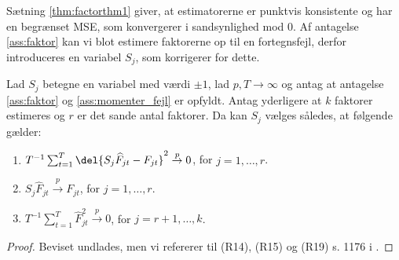 Sætning \ref{thm:factorthm1} giver, at estimatorerne er punktvis konsistente og har en begrænset MSE, som konvergerer i sandsynlighed mod 0.
Af antagelse \ref{ass:faktor} kan vi blot estimere faktorerne op til en fortegnsfejl, derfor introduceres en variabel \(S_j\), som korrigerer for dette.
%
\begin{thm} \label{thm:factorthm1}
Lad \(S_j\) betegne en variabel med værdi \(\pm 1\), lad \(p, T \rightarrow \infty\) og antag at antagelse \ref{ass:faktor} og \ref{ass:momenter_fejl} er opfyldt.
Antag yderligere at \(k\) faktorer estimeres og \(r\) er det sande antal faktorer.
Da kan \(S_j\) vælges således, at følgende gælder:
\begin{enumerate}[label=\alph*)]
\item \(T^{-1} \sum_{t=1}^T \del{S_j \widehat{F}_{jt} - F_{jt}}^2 \overset{p}{\rightarrow} 0\), for \(j=1, \ldots, r\).
\item \(S_j \widehat{F}_{jt} \overset{p}{\rightarrow} F_{jt}\), for \(j=1, \ldots, r\).
\item \(T^{-1} \sum_{t=1}^T \widehat{F}_{jt}^2 \overset{p}{\rightarrow} 0\), for \(j=r+1, \ldots, k\).
\end{enumerate}
\end{thm}
%
\begin{proof}
Beviset undlades, men vi refererer til (R14), (R15) og (R19) s. 1176 i \citep{stock_watson_2002a}.
\end{proof}
%
%
